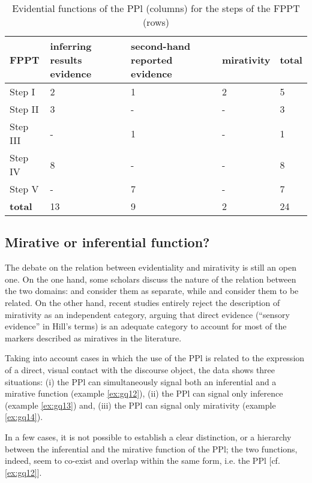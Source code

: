 \documentclass[output=paper]{langsci/langscibook}
\begin{document}
\begin{table}
\begin{tabularx}{\textwidth}{XXXXX}
\hline
 \textbf{FPPT} & \textbf{inferring results evidence} & \textbf{second-hand reported evidence} & \textbf{mirativity} & \textbf{total}\\
\hline
Step I & 2 & 1 & 2 & 5\\
Step II & 3 & {-} & {-} & 3\\
Step III & {-} & 1 & {-} & 1\\
Step IV & 8 & {-} & {-} & 8\\
Step V & {-} & 7 & {-} & 7\\
\hline
\textbf{total} & 13 & 9 & 2 & 24\\
\hline
\end{tabularx}
\caption{Evidential functions of the PPl (columns) for the steps of the FPPT (rows)}\label{tab:gq2}
\end{table}


\subsection{Mirative or inferential function?}\label{s:gq4-1}

The debate on the relation between evidentiality and mirativity is still an open one. On the one hand, some scholars discuss the nature of the relation between the two domains: \citet{DeLancey1997} and \citet{Aikhenvald2004} consider them as separate, while \citet{Lazard1999} and \citet{Haan2012} consider them to be related. On the other hand, recent studies \citep{Hill2012} entirely reject the description of mirativity as an independent category, arguing that direct evidence (“sensory evidence” in Hill’s terms) is an adequate category to account for most of the markers described as miratives in the literature. 

Taking into account cases in which the use of the PPl is related to the expression of a direct, visual contact with the discourse object, the data shows three situations: (i) the PPl can simultaneously signal both an inferential and a mirative function (example \ref{ex:gq12}), (ii) the PPl can signal only inference (example \ref{ex:gq13}) and, (iii) the PPl can signal only mirativity (example \ref{ex:gq14}).

In a few cases, it is not possible to establish a clear distinction, or a hierarchy between the inferential \citep{Willett1988} and the mirative function of the PPl; the two functions, indeed, seem to co-exist and overlap within the same form, i.e. the PPl [cf. \ref{ex:gq12}]. 
\end{document}
